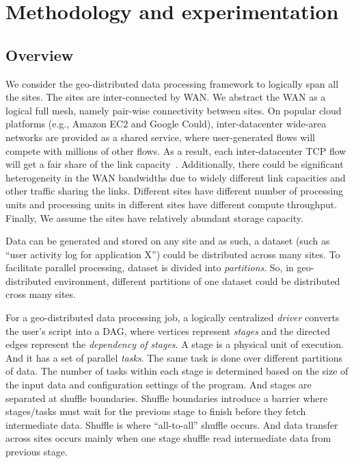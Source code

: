 \documentclass[base.tex]{subfiles}
\begin{document}
\section{Methodology and experimentation}
\subsection{Overview}
\iffalse
@@@@ We don't know how to deal with indent
\fi
We consider the geo-distributed data processing framework to logically span all the sites. The sites are inter-connected by WAN. We abstract the WAN as a logical full mesh, namely pair-wise connectivity between sites. On popular cloud platforms (e.g., Amazon EC2 and Google Could), inter-datacenter wide-area networks are provided as a shared service, where user-generated flows will compete with millions of other flows. As a result, each inter-datacenter TCP flow will get a fair share of the link capacity~\cite{chen2018scheduling}. \iffalse Our measurement with iperf3 on EC2 verifies this assumption.\fi Additionally, there could be significant heterogeneity in the WAN bandwidths due to widely different link capacities and other traffic sharing the links. Different sites have different number of processing units and processing units in different sites have different compute throughput. Finally, We assume the sites have relatively abundant storage capacity.

Data can be generated and stored on any site and as such, a dataset (such as ``user activity log for application X'') could be distributed across many sites. To facilitate parallel processing, dataset is divided into \textit{partitions}. So, in geo-distributed environment, different partitions of one dataset could be distributed cross many sites.

For a geo-distributed data processing job, a logically centralized \textit{driver} converts the user's script into a DAG, where vertices represent \textit{stages} and the directed edges represent the \textit{dependency of stages}. A stage is a physical unit of execution. And it has a set of parallel \textit{tasks}. The same task is done over different partitions of data. The number of tasks within each stage is determined based on the size of the input data and configuration settings of the program. And stages are separated at shuffle boundaries. Shuffle boundaries introduce a barrier where stages/tasks must wait for the previous stage to finish before they fetch intermediate data. Shuffle is where ``all-to-all'' shuffle occurs. And data transfer across sites occurs mainly when one stage shuffle read intermediate data from previous stage.
\end{document}
